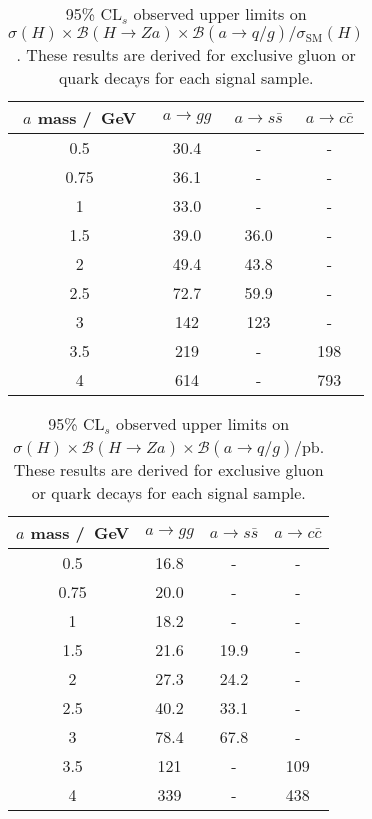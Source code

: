 \documentclass[NOTE, atlasdraft=true, texlive=2017, UKenglish]{\ATLASLATEXPATH atlasdoc}
\begin{document}
\begin{table}[!htbp]{\footnotesize\renewcommand{\arraystretch}{1.2}
  \begin{center}
    \footnotesize
    \begin{tabular}{|c|ccc|}
      \hline
      $a$ mass /~GeV & $a\to gg$ & $a\to s\bar s$ & $a\to c\bar c$ \\
      \hline
      0.5  & 30.4 & -    & -    \\
      0.75 & 36.1 & -    & -    \\
      1    & 33.0 & -    & -    \\
      1.5  & 39.0 & 36.0 & -    \\
      2    & 49.4 & 43.8 & -    \\
      2.5  & 72.7 & 59.9 & -    \\
      3    & 142  & 123  & -    \\
      3.5  & 219  & -    & 198  \\
      4    & 614  & -    & 793  \\
      \hline
    \end{tabular}
    \caption{95\% $\text{CL}_s$ observed upper limits on $\sigma(H)\times\mathcal{B}(H\to Za)\times\mathcal{B}(a\to q/g)/\sigma_\text{SM}(H)$. These results are derived for exclusive gluon or quark decays for each signal sample.}
    \label{tab:observedmodelindepedentresults}
  \end{center}}
\end{table}


\begin{table}[!htbp]{\footnotesize\renewcommand{\arraystretch}{1.2}
  \begin{center}
    \footnotesize
    \begin{tabular}{|c|ccc|}
      \hline
      $a$ mass /~GeV & $a\to gg$ & $a\to s\bar s$ & $a\to c\bar c$ \\
      \hline
      0.5  & 16.8 & -    & -   \\
      0.75 & 20.0 & -    & -   \\
      1    & 18.2 & -    & -   \\
      1.5  & 21.6 & 19.9 & -   \\
      2    & 27.3 & 24.2 & -   \\
      2.5  & 40.2 & 33.1 & -   \\
      3    & 78.4 & 67.8  & -   \\
      3.5  & 121  & -    & 109 \\
      4    & 339  & -    & 438 \\
      \hline
    \end{tabular}
    \caption{95\% $\text{CL}_s$ observed upper limits on $\sigma(H)\times\mathcal{B}(H\to Za)\times\mathcal{B}(a\to q/g)/\text{pb}$. These results are derived for exclusive gluon or quark decays for each signal sample.}
    \label{tab:observedmodelindepedentresultsxsec}
  \end{center}}
\end{table}
\end{document}
